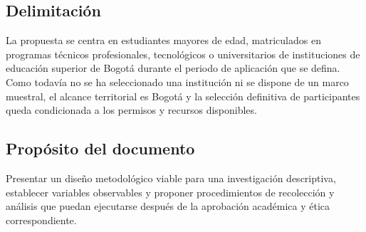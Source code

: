 \subsection{Delimitación}
La propuesta se centra en estudiantes mayores de edad, matriculados en programas técnicos profesionales, tecnológicos o universitarios de instituciones de educación superior de Bogotá durante el periodo de aplicación que se defina. Como todavía no se ha seleccionado una institución ni se dispone de un marco muestral, el alcance territorial es Bogotá y la selección definitiva de participantes queda condicionada a los permisos y recursos disponibles.

\subsection{Propósito del documento}
Presentar un diseño metodológico viable para una investigación descriptiva, establecer variables
observables y proponer procedimientos de recolección y análisis que puedan ejecutarse después de la aprobación
académica y ética correspondiente.
